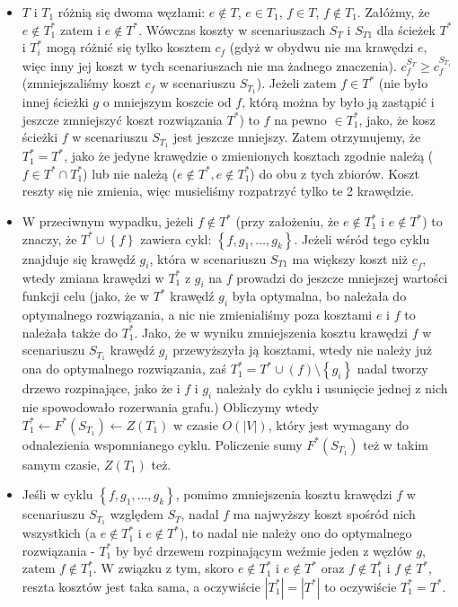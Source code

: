 \begin{itemize}
	\item $T$ i $T_{1}$ różnią się dwoma węzłami: $e \notin T$, $e \in T_{1}$, $f \in T$, $f \notin T_{1}$. Załóżmy, że $e \notin T_{1}^{\ast}$ zatem i $e \notin T^{\ast}$. Wówczas koszty w scenariuszach $S_{T}$ i $S_{T{1}}$ dla ścieżek $T^{\ast}$ i $T_{i}^{\ast}$ mogą różnić się tylko kosztem $c_{f}$ (gdyż w obydwu nie ma krawędzi $e$, więc inny jej koszt w tych scenariuszach nie ma żadnego znaczenia). $c^{S_{T}}_{f} \geqslant c^{S_{T_{1}}}_{f}$ (zmniejszaliśmy koszt $c_{f}$ w scenariuszu $S_{T_{1}}$). Jeżeli zatem $f \in T^{\ast}$ (nie było innej ścieżki $g$ o mniejszym koszcie od $f$, którą można by było ją zastąpić i jeszcze zmniejszyć koszt rozwiązania $T^{\ast}$) to $f$ na pewno $\in T_{1}^{\ast}$, jako, że kosz ścieżki $f$ w scenariuszu $S_{T_{1}}$ jest jeszcze mniejszy. Zatem otrzymujemy, że $T_{1}^{\ast} = T^{\ast}$, jako że jedyne krawędzie o zmienionych kosztach zgodnie należą ($f \in T^{\ast} \cap T_{1}^{\ast}$) lub nie należą ($e \notin T^{\ast}, e \notin T_{1}^{\ast}$) do obu z tych zbiorów. Koszt reszty się nie zmienia, więc musieliśmy rozpatrzyć tylko te 2 krawędzie.
	\item W przeciwnym wypadku, jeżeli $f \notin T^{\ast}$ (przy założeniu, że $e \notin T_{1}^{\ast}$ i $e \notin T^{\ast}$) to znaczy, że $T^{\ast} \cup \left\{ f \right\}$ zawiera cykl: $\left\{ f, g_{1}, \dots, g_{k} \right\}$. Jeżeli wśród tego cyklu znajduje się krawędź $g_{i}$, która w scenariuszu $S_{T{1}}$ ma większy koszt niż $\underline{c}_{f}$, wtedy zmiana krawędzi w $T_{1}^{\ast}$ z $g_{i}$ na $f$ prowadzi do jeszcze mniejszej wartości funkcji celu (jako, że w $T^{\ast}$ krawędź $g_{i}$ była optymalna, bo należała do optymalnego rozwiązania, a nic nie zmienialiśmy poza kosztami $e$ i $f$ to należała także do $T_{1}^{\ast}$. Jako, że w wyniku zmniejszenia kosztu krawędzi $f$ w scenariuszu $S_{T_{1}}$ krawędź $g_{i}$ przewyższyła ją kosztami, wtedy nie należy już ona do optymalnego rozwiązania, zaś $T_{1}^{\ast} = T^{\ast} \cup \left( f \right) \setminus \left\{ g_{i} \right\}$ nadal tworzy drzewo rozpinające, jako że i $f$ i $g_{i}$ należały do cyklu i usunięcie jednej z nich nie spowodowało rozerwania grafu.) Obliczymy wtedy $T_{1}^{\ast} \longleftarrow F^{\ast} \left( S_{T_{1}} \right) \longleftarrow Z \left( T_{1} \right)$ w czasie $O \left( \left| V \right| \right)$, który jest wymagany do odnalezienia wspomnianego cyklu. Policzenie sumy $F^{\ast} \left( S_{T_{1}} \right)$ też w takim samym czasie, $Z \left( T_{1} \right)$ też.
	\item Jeśli w cyklu $\left\{ f, g_{1}, \dots, g_{k} \right\}$, pomimo zmniejszenia kosztu krawędzi $f$ w scenariuszu $S_{T_{1}}$ względem $S_{T}$, nadal $f$ ma najwyższy koszt spośród nich wszystkich (a $e \notin T_{1}^{\ast}$ i $e \notin T^{\ast}$), to nadal nie należy ono do optymalnego rozwiązania - $T_{1}^{\ast}$ by być drzewem rozpinającym weźmie jeden z węzłów $g$, zatem $f \notin T_{1}^{\ast}$. W związku z tym, skoro $e \notin T_{1}^{\ast}$ i $e \notin T^{\ast}$ oraz $f \notin T_{1}^{\ast}$ i $f \notin T^{\ast}$, reszta kosztów jest taka sama, a oczywiście $\left| T_{1}^{\ast} \right| = \left| T^{\ast} \right|$ to oczywiście $T_{1}^{\ast} = T^{\ast}$.

\end{itemize}
